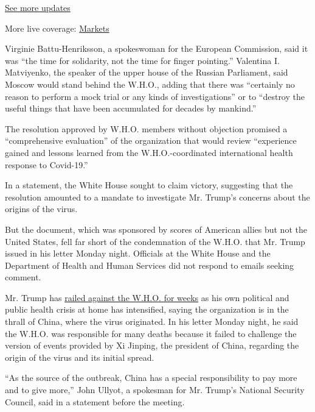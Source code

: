 \href{https://www.nytimes3xbfgragh.onion/2020/08/21/world/covid-19-coronavirus.html?action=click\&pgtype=Article\&state=default\&region=MAIN_CONTENT_1\&context=storylines_live_updates}{See
more updates}

More live coverage:
\href{https://www.nytimes3xbfgragh.onion/live/2020/08/21/business/stock-market-today-coronavirus?action=click\&pgtype=Article\&state=default\&region=MAIN_CONTENT_1\&context=storylines_live_updates}{Markets}

Virginie Battu-Henriksson, a spokeswoman for the European Commission,
said it was ``the time for solidarity, not the time for finger
pointing.'' Valentina I. Matviyenko, the speaker of the upper house of
the Russian Parliament, said Moscow would stand behind the W.H.O.,
adding that there was ``certainly no reason to perform a mock trial or
any kinds of investigations'' or to ``destroy the useful things that
have been accumulated for decades by mankind.''

The resolution approved by W.H.O. members without objection promised a
``comprehensive evaluation'' of the organization that would review
``experience gained and lessons learned from the W.H.O.-coordinated
international health response to Covid-19.''

In a statement, the White House sought to claim victory, suggesting that
the resolution amounted to a mandate to investigate Mr. Trump's concerns
about the origins of the virus.

But the document, which was sponsored by scores of American allies but
not the United States, fell far short of the condemnation of the W.H.O.
that Mr. Trump issued in his letter Monday night. Officials at the White
House and the Department of Health and Human Services did not respond to
emails seeking comment.

Mr. Trump has
\href{https://www.nytimes3xbfgragh.onion/2020/04/07/us/politics/coronavirus-trump-who.html}{railed
against the W.H.O. for weeks} as his own political and public health
crisis at home has intensified, saying the organization is in the thrall
of China, where the virus originated. In his letter Monday night, he
said the W.H.O. was responsible for many deaths because it failed to
challenge the version of events provided by Xi Jinping, the president of
China, regarding the origin of the virus and its initial spread.

``As the source of the outbreak, China has a special responsibility to
pay more and to give more,'' John Ullyot, a spokesman for Mr. Trump's
National Security Council, said in a statement before the meeting.


